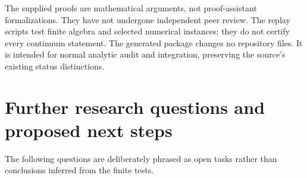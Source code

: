 \documentclass[11pt,letterpaper]{article}
\numberwithin{equation}{section}
\theoremstyle{definition}
\theoremstyle{remark}
\begin{document}
The supplied proofs are mathematical arguments, not proof-assistant
formalizations. They have not undergone independent peer review. The
replay scripts test finite algebra and selected numerical instances;
they do not certify every continuum statement. The generated package
changes no repository files. It is intended for normal analytic audit
and integration, preserving the source's existing status distinctions.

\section{Further research questions and proposed next steps}
\label{bc:sec:questions}

The following questions are deliberately phrased as open tasks rather
than conclusions inferred from the finite tests.
\end{document}
